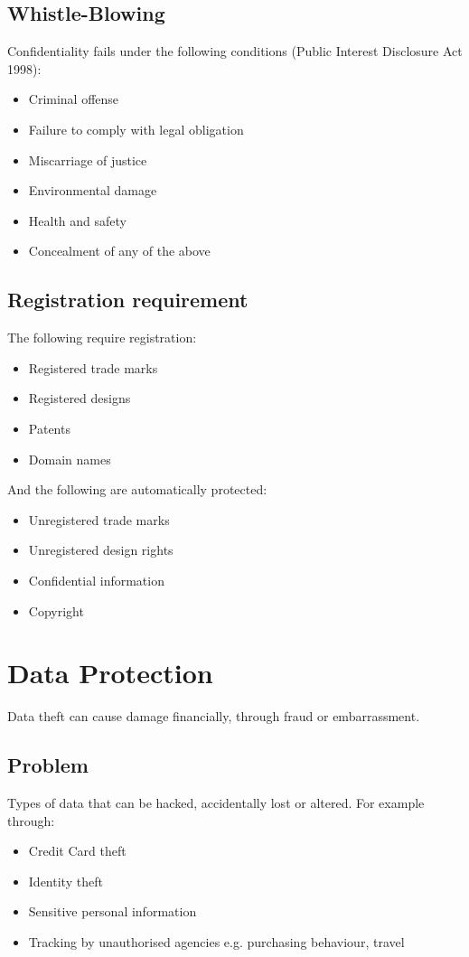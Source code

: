 \documentclass[a4paper]{article}
\theoremstyle{plain}
\theoremstyle{definition}
\theoremstyle{remark}
\begin{document}
\subsection{Whistle-Blowing}
Confidentiality fails under the following conditions (Public Interest Disclosure Act 1998):
\begin{itemize}
	\item Criminal offense
	\item Failure to comply with legal obligation
	\item Miscarriage of justice
	\item Environmental damage
	\item Health and safety
	\item Concealment of any of the above
\end{itemize}
\subsection{Registration requirement}
The following require registration:
\begin{itemize}
	\item Registered trade marks
	\item Registered designs
	\item Patents
	\item Domain names
\end{itemize}
And the following are automatically protected:
\begin{itemize}
	\item Unregistered trade marks
	\item Unregistered design rights
	\item Confidential information
	\item Copyright
\end{itemize}
\section{Data Protection}
Data theft can cause damage financially, through fraud or embarrassment.
\subsection{Problem}
Types of data that can be hacked, accidentally lost or altered. For example through:
\begin{itemize}
	\item Credit Card theft
	\item Identity theft
	\item Sensitive personal information
	\item Tracking by unauthorised agencies e.g. purchasing behaviour, travel
\end{itemize}
\end{document}
